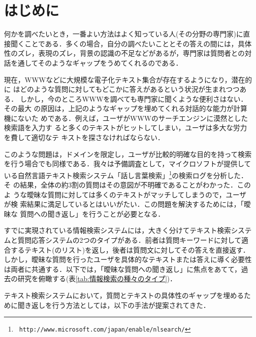 


\maketitle




\section{はじめに}
\thispagestyle{empty}
何かを調べたいとき，一番よい方法はよく知っている人(その分野の専門家)に直
接聞くことである．多くの場合，自分の調べたいこととその答えの間には，具体
性のズレ，表現のズレ，背景の認識の不足などがあるが，専門家は質問者との対
話を通してそのようなギャップをうめてくれるのである．

現在，WWWなどに大規模な電子化テキスト集合が存在するようになり，潜在的に
はどのような質問に対してもどこかに答えがあるという状況が生まれつつある．
しかし，今のところWWWを調べても専門家に聞くような便利さはない．その最大
の原因は，上記のようなギャップを埋めてくれる対話的な能力が計算機にないた
めである．例えば，ユーザがWWWのサーチエンジンに漠然とした検索語を入力す
ると多くのテキストがヒットしてしまい，ユーザは多大な労力を費して適切なテ
キストを探さなければならない．

このような問題は，ドメインを限定し，ユーザが比較的明確な目的を持って検索
を行う場合でも同様である．我々は予備調査として，マイクロソフトが提供して
いる自然言語テキスト検索システム「話し言葉検索」\footnote{\tt
http://www.microsoft.com/japan/enable/nlsearch/}の検索ログを分析した．そ
の結果，全体の約3割の質問はその意図が不明確であることがわかった．このよ
うな曖昧な質問に対しては多くのテキストがマッチしてしまうので，ユーザが検
索結果に満足しているとはいいがたい．この問題を解決するためには，「曖昧な
質問への聞き返し」を行うことが必要となる．


すでに実現されている情報検索システムには，大きく分けてテキスト検索システ
ムと質問応答システムの2つのタイプがある．前者は質問キーワードに対して適
合するテキスト(のリスト)を返し，後者は質問文に対してその答えを直接返す．
しかし，曖昧な質問を行ったユーザを具体的なテキストまたは答えに導く必要性
は両者に共通する．以下では，「曖昧な質問への聞き返し」に焦点をあてて，過
去の研究を俯瞰する(表\ref{tab:情報検索の種々のタイプ})．

テキスト検索システムにおいて，質問とテキストの具体性のギャップを埋めるた
めに聞き返しを行う方法としては，以下の手法が提案されてきた．

